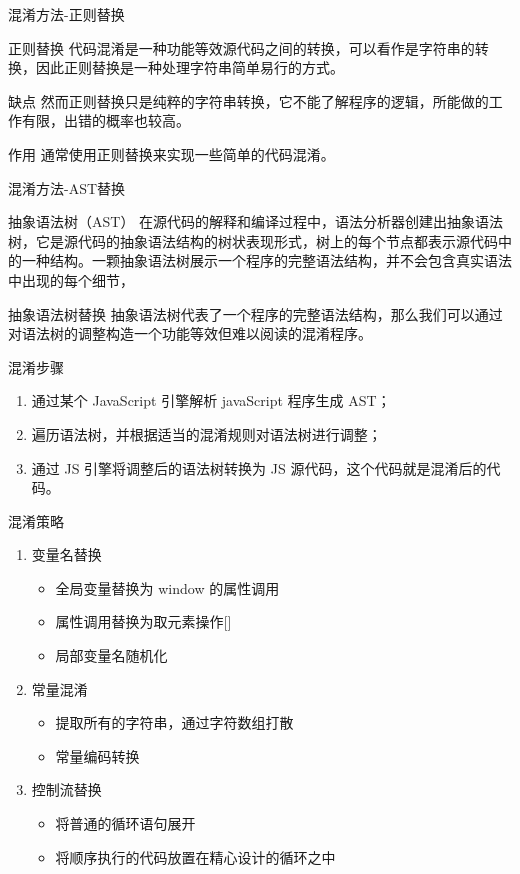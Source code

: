 \documentclass[presentation]{beamer}
\begin{document}
\begin{frame}[label=sec-8]{混淆方法-正则替换}
\begin{block}{正则替换}
代码混淆是一种功能等效源代码之间的转换，可以看作是字符串的转换，因此正则替换是一种处理字符串简单易行的方式。
\end{block}
\begin{block}{缺点}
然而正则替换只是纯粹的字符串转换，它不能了解程序的逻辑，所能做的工作有限，出错的概率也较高。
\end{block}
\begin{block}{作用}
通常使用正则替换来实现一些简单的代码混淆。
\end{block}
\end{frame}
\begin{frame}[label=sec-9]{混淆方法-AST替换}
\begin{block}{抽象语法树（AST）}
在源代码的解释和编译过程中，语法分析器创建出抽象语法树，它是源代码的抽象语法结构的树状表现形式，树上的每个节点都表示源代码中的一种结构。一颗抽象语法树展示一个程序的完整语法结构，并不会包含真实语法中出现的每个细节，
\end{block}
\begin{block}{抽象语法树替换}
抽象语法树代表了一个程序的完整语法结构，那么我们可以通过对语法树的调整构造一个功能等效但难以阅读的混淆程序。
\end{block}
\begin{block}{混淆步骤}
\begin{enumerate}
\item 通过某个 JavaScript 引擎解析 javaScript 程序生成 AST；
\item 遍历语法树，并根据适当的混淆规则对语法树进行调整；
\item 通过 JS 引擎将调整后的语法树转换为 JS 源代码，这个代码就是混淆后的代码。
\end{enumerate}
\end{block}
\end{frame}
\begin{frame}[label=sec-10]{混淆策略}
\begin{enumerate}
\item 变量名替换
\begin{itemize}
\item 全局变量替换为 window 的属性调用
\item 属性调用替换为取元素操作[]
\item 局部变量名随机化
\end{itemize}
\item 常量混淆
\begin{itemize}
\item 提取所有的字符串，通过字符数组打散
\item 常量编码转换
\end{itemize}
\item 控制流替换
\begin{itemize}
\item 将普通的循环语句展开
\item 将顺序执行的代码放置在精心设计的循环之中
\end{itemize}
\end{enumerate}
\end{frame}
\end{document}
